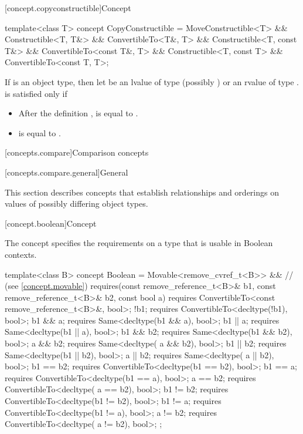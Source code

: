 [concept.copyconstructible]{Concept }

%
\begin{itemdecl}
template<class T>
  concept CopyConstructible =
    MoveConstructible<T> &&
    Constructible<T, T&> && ConvertibleTo<T&, T> &&
    Constructible<T, const T&> && ConvertibleTo<const T&, T> &&
    Constructible<T, const T> && ConvertibleTo<const T, T>;
\end{itemdecl}

\begin{itemdescr}
\pnum
If  is an object type, then let  be an lvalue of type
(possibly )  or an rvalue of type .
 is satisfied only if

\begin{itemize}
\item After the definition ,  is equal to .

\item {} is equal to .
\end{itemize}

\end{itemdescr}

[concepts.compare]{Comparison concepts}

[concepts.compare.general]{General}

\pnum
This section describes concepts that establish relationships and orderings
on values of possibly differing object types.

[concept.boolean]{Concept }

\pnum
The  concept specifies the requirements on a type that is
usable in Boolean contexts.

%
\begin{itemdecl}
template<class B>
  concept Boolean =
    Movable<remove_cvref_t<B>> && // (see \ref{concept.movable})
    requires(const remove_reference_t<B>& b1,
             const remove_reference_t<B>& b2, const bool a) {
      requires ConvertibleTo<const remove_reference_t<B>&, bool>;
      !b1;      requires ConvertibleTo<decltype(!b1), bool>;
      b1 &&  a; requires Same<decltype(b1 &&  a), bool>;
      b1 ||  a; requires Same<decltype(b1 ||  a), bool>;
      b1 && b2; requires Same<decltype(b1 && b2), bool>;
       a && b2; requires Same<decltype( a && b2), bool>;
      b1 || b2; requires Same<decltype(b1 || b2), bool>;
       a || b2; requires Same<decltype( a || b2), bool>;
      b1 == b2; requires ConvertibleTo<decltype(b1 == b2), bool>;
      b1 ==  a; requires ConvertibleTo<decltype(b1 ==  a), bool>;
       a == b2; requires ConvertibleTo<decltype( a == b2), bool>;
      b1 != b2; requires ConvertibleTo<decltype(b1 != b2), bool>;
      b1 !=  a; requires ConvertibleTo<decltype(b1 !=  a), bool>;
       a != b2; requires ConvertibleTo<decltype( a != b2), bool>;
    };
\end{itemdecl}

